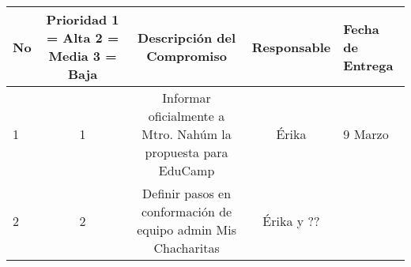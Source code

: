 \documentclass[]{book}
\begin{document}
\begin{longtable}[]{@{}lcccl@{}}
\toprule
\begin{minipage}[b]{0.03\columnwidth}\raggedright\strut
No\strut
\end{minipage} & \begin{minipage}[b]{0.23\columnwidth}\centering\strut
Prioridad 1 = Alta 2 = Media 3 = Baja\strut
\end{minipage} & \begin{minipage}[b]{0.37\columnwidth}\centering\strut
Descripción del Compromiso\strut
\end{minipage} & \begin{minipage}[b]{0.12\columnwidth}\centering\strut
Responsable\strut
\end{minipage} & \begin{minipage}[b]{0.11\columnwidth}\raggedright\strut
Fecha de Entrega\strut
\end{minipage}\tabularnewline
\midrule
\endhead
\begin{minipage}[t]{0.03\columnwidth}\raggedright\strut
1\strut
\end{minipage} & \begin{minipage}[t]{0.23\columnwidth}\centering\strut
1\strut
\end{minipage} & \begin{minipage}[t]{0.37\columnwidth}\centering\strut
Informar oficialmente a Mtro. Nahúm la propuesta para EduCamp\strut
\end{minipage} & \begin{minipage}[t]{0.12\columnwidth}\centering\strut
Érika\strut
\end{minipage} & \begin{minipage}[t]{0.11\columnwidth}\raggedright\strut
9 Marzo\strut
\end{minipage}\tabularnewline
\begin{minipage}[t]{0.03\columnwidth}\raggedright\strut
2\strut
\end{minipage} & \begin{minipage}[t]{0.23\columnwidth}\centering\strut
2\strut
\end{minipage} & \begin{minipage}[t]{0.37\columnwidth}\centering\strut
Definir pasos en conformación de equipo admin Mis Chacharitas\strut
\end{minipage} & \begin{minipage}[t]{0.12\columnwidth}\centering\strut
Érika y ??\strut
\end{minipage} & \begin{minipage}[t]{0.11\columnwidth}\raggedright\strut

\end{minipage}
\end{longtable}
\end{document}
